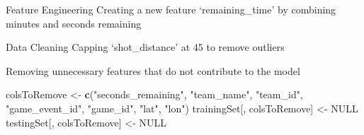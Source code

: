 \documentclass[
]{article}
\newenvironment{Shaded}{\begin{snugshade}}{\end{snugshade}}
\newcommand{\ConstantTok}[1]{\textcolor[rgb]{0.56,0.35,0.01}{#1}}
\newcommand{\DecValTok}[1]{\textcolor[rgb]{0.00,0.00,0.81}{#1}}
\newcommand{\FunctionTok}[1]{\textcolor[rgb]{0.13,0.29,0.53}{\textbf{#1}}}
\newcommand{\NormalTok}[1]{#1}
\newcommand{\OtherTok}[1]{\textcolor[rgb]{0.56,0.35,0.01}{#1}}
\newcommand{\SpecialCharTok}[1]{\textcolor[rgb]{0.81,0.36,0.00}{\textbf{#1}}}
\newcommand{\StringTok}[1]{\textcolor[rgb]{0.31,0.60,0.02}{#1}}
\begin{document}
Feature Engineering Creating a new feature `remaining\_time' by
combining minutes and seconds remaining

\begin{Shaded}
\end{Shaded}

Data Cleaning Capping `shot\_distance' at 45 to remove outliers

\begin{Shaded}
\end{Shaded}

Removing unnecessary features that do not contribute to the model

\begin{Shaded}
\begin{Highlighting}[]
\NormalTok{colsToRemove }\OtherTok{\textless{}{-}} \FunctionTok{c}\NormalTok{(}\StringTok{"seconds\_remaining"}\NormalTok{, }\StringTok{"team\_name"}\NormalTok{, }\StringTok{"team\_id"}\NormalTok{, }\StringTok{"game\_event\_id"}\NormalTok{, }\StringTok{"game\_id"}\NormalTok{, }\StringTok{"lat"}\NormalTok{, }\StringTok{"lon"}\NormalTok{)}
\NormalTok{trainingSet[, colsToRemove] }\OtherTok{\textless{}{-}} \ConstantTok{NULL}
\NormalTok{testingSet[, colsToRemove] }\OtherTok{\textless{}{-}} \ConstantTok{NULL}
\end{Highlighting}
\end{Shaded}
\end{document}
